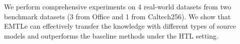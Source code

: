 We perform comprehensive experiments on 4 real-world datasets from two benchmark datasets (3 from Office and 1 from Caltech256). We show that EMTLe can effectively transfer the knowledge with different types of source models and outperforms the baseline methods under the HTL setting. %

